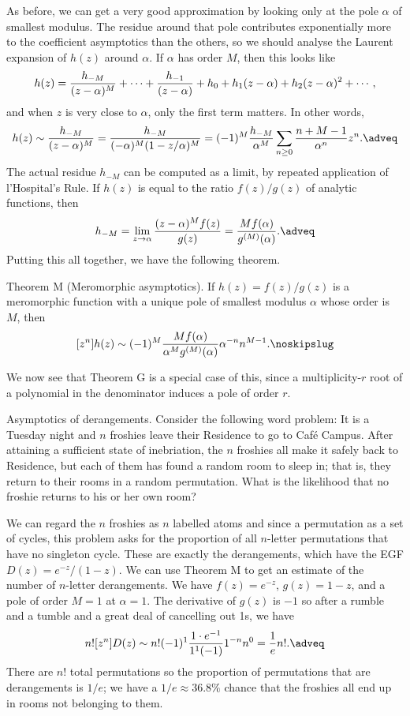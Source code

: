 As before, we can get a very good approximation by looking only at the pole $\alpha$ of smallest modulus.
The residue around that pole contributes exponentially more to the coefficient asymptotics than the others,
so we should analyse the Laurent expansion of $h(z)$ around $\alpha$. If $\alpha$ has order $M$, then
this looks like
$$h(z) = {h_{-M} \over (z-\alpha)^M} + \cdots + {h_{-1}\over (z-\alpha)} + h_0
    + h_1(z-\alpha) + h_2(z-\alpha)^2 + \cdots,$$
and when $z$ is very close to $\alpha$, only the first term matters. In other words,
$$h(z) \sim {h_{-M} \over (z-\alpha)^M} = {h_{-M}\over (-\alpha)^M (1-z/\alpha)^M}
   = (-1)^M{h_{-M}\over\alpha^M} \sum_{n\geq 0} {n+M-1\over \alpha^n}z^n.\adveq$$
The actual residue $h_{-M}$ can be computed as a limit, by repeated application of l'Hospital's Rule.
If $h(z)$ is equal to the ratio $f(z)/g(z)$ of analytic functions, then
$$h_{-M} = \lim_{z\to \alpha} {(z-\alpha)^M f(z) \over g(z)} = {Mf(\alpha) \over g^{(M)}(\alpha)}.\adveq$$
Putting this all together, we have the following theorem.

\parenproclaim Theorem M (Meromorphic asymptotics). If $h(z) = f(z)/g(z)$ is a meromorphic function with
a unique pole of smallest modulus $\alpha$ whose order is $M$, then
$$[z^n]h(z) \sim (-1)^M {Mf(\alpha) \over \alpha^M g^{(M)}(\alpha)} \alpha^{-n} n^{M-1}.\noskipslug$$

We now see that Theorem G is a special case of this, since a multiplicity-$r$
root of a polynomial in the denominator induces a pole of order $r$.
\medskip

\boldlabel Asymptotics of derangements. Consider the following word problem: It is a Tuesday night and
$n$ froshies leave their Residence to go to Caf\'e Campus. After attaining a sufficient state of inebriation,
the $n$ froshies all make it safely back to Residence, but each of them has found a random room to sleep in;
that is, they return to their rooms in a random permutation. What is the likelihood that no froshie returns
to his or her own room?

We can regard the $n$ froshies as $n$ labelled atoms and since a permutation as a set of cycles,
this problem asks for the proportion of all $n$-letter permutations
that have no singleton cycle. These are exactly the derangements, which have the EGF
$D(z) = e^{-z}/(1-z)$.
We can use Theorem M to get an estimate of the number of $n$-letter derangements. We have $f(z) = e^{-z}$,
$g(z) = 1-z$, and a pole of order $M=1$ at $\alpha=1$. The derivative of $g(z)$ is $-1$ so after a rumble and
a tumble and a great deal of cancelling out 1s, we have
$$n![z^n]D(z) \sim n! (-1)^1 {1\cdot e^{-1} \over 1^1 (-1)} 1^{-n} n^0 = {1\over e}n!.\adveq$$
There are $n!$ total permutations so the proportion of permutations that are derangements is $1/e$;
we have a $1/e \approx 36.8\%$ chance that the froshies all end up in rooms not belonging to them.

